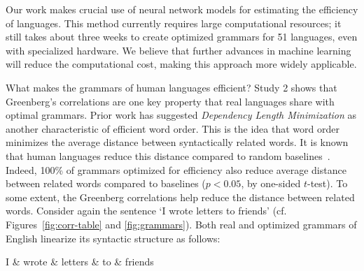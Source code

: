 \documentclass[9pt,twocolumn,twoside,lineno]{pnas-new}
\begin{document}
Our work makes crucial use of neural network models for estimating the efficiency of languages.
This method currently requires large computational resources; it still takes about three weeks to create optimized grammars for 51 languages, even with specialized hardware.
We believe that further advances in machine learning will reduce the computational cost, making this approach more widely applicable.


What makes the grammars of human languages efficient?
Study 2 shows that Greenberg's correlations are one key property that real languages share with optimal grammars.
Prior work has suggested \emph{Dependency Length Minimization} as another characteristic of efficient word order.
This is the idea that word order minimizes the average distance between syntactically related words.
It is known that human languages reduce this distance compared to random baselines~\cite{futrell2015largescale,liu2017dependency,temperley2018minimizing}.
Indeed, 100\% of grammars optimized for efficiency also reduce average distance between related words  compared to baselines ($p < 0.05$, by one-sided $t$-test).
To some extent, the Greenberg correlations help reduce the distance between related words. Consider again the sentence `I wrote letters to friends' (cf. Figures~\ref{fig:corr-table} and \ref{fig:grammars}). Both real and optimized grammars of English linearize its syntactic structure as follows:
\begin{center}
\begin{dependency}[theme = simple]
   \begin{deptext}[column sep=1em]
          I \& wrote \& letters \& to \& friends  \\
   \end{deptext}
\end{dependency}
\end{center}
\end{document}
